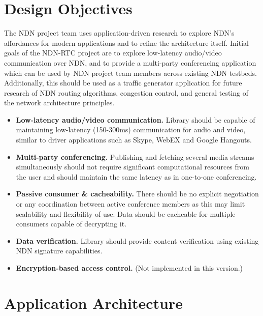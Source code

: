 \documentclass{icn/sig-alternate-2012} %
\newcommand{\ndnrtcName}{NDN-RTC} %
\begin{document}
\section{Design Objectives}
\label{sec:goals}
The NDN project team uses application-driven research to explore NDN's affordances for modern applications and to refine the architecture itself.  Initial goals of the \ndnrtcName{} project are to explore low-latency audio/video communication over NDN, and to provide a multi-party conferencing application which can be used by NDN project team members across existing NDN testbeds. Additionally, this should be used as a traffic generator application for future research of NDN routing algorithms, congestion control, and general testing of the network architecture principles.
\begin{itemize}
\item \textbf{Low-latency audio/video communication.} Library should be capable of maintaining low-latency (150-300ms) communication for audio and video, similar to driver applications such as Skype, WebEX and Google Hangouts.

\item \textbf{Multi-party conferencing.} Publishing and fetching several media streams simultaneously should not require significant computational resources from the user and should maintain the same latency as in one-to-one conferencing.

\item \textbf{Passive consumer \& cacheability.} There should be no explicit negotiation or any coordination between active conference members as this may limit scalability and flexibility of use. Data should be cacheable for multiple consumers capable of decrypting it. 

\item \textbf{Data verification.} Library should provide content verification using existing NDN signature capabilities. 

\item \textbf{Encryption-based access control.}   (Not implemented in this version.)
\end{itemize} 

\section{Application Architecture}
\label{sec:arch}
\end{document}
